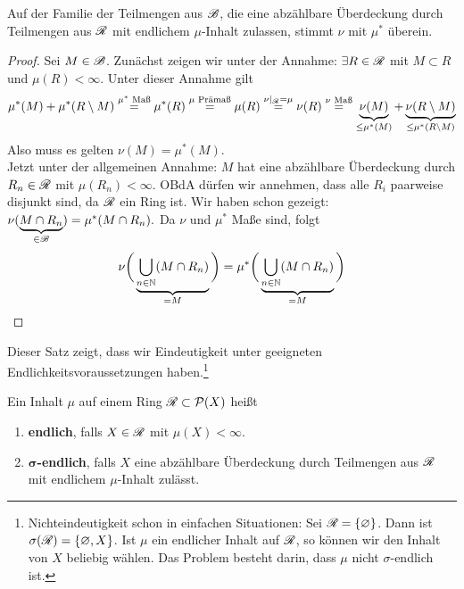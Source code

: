 \begin{satz}
\begin{mdframed}
Auf der Familie der Teilmengen aus $\mathscr{B}$, die eine abzählbare Überdeckung durch Teilmengen aus $\mathscr{R}$ mit endlichem $\mu$-Inhalt zulassen, stimmt $\nu$ mit $\mu^*$ überein.
\end{mdframed}
\begin{proof}
Sei $M \in \mathscr{B}$. Zunächst zeigen wir unter der Annahme: $\exists R \in \mathscr{R}$ mit $M \subset R$ und $\mu(R)< \infty$. Unter dieser Annahme gilt
$$
\mu^*(M)+\mu^*(R\setminus M)\overset{\mu^* \text{ Maß}}=\mu^*(R) \overset{\mu \text{ Prämaß}}= \mu (R) \overset{\nu|_{\mathscr{R}}=\mu} = \nu (R) \overset{\nu \text{ Maß}}= \underbrace{\nu(M)}_{\leq \mu^*(M)}+\underbrace{\nu(R \setminus M)}_{\leq \mu^*(R\setminus M)}
$$
Also muss es gelten $\nu(M)= \mu^*(M)$. \\
Jetzt unter der allgemeinen Annahme: $M$ hat eine abzählbare Überdeckung durch $R_n \in \mathscr{R}$ mit $\mu(R_n)< \infty$. OBdA dürfen wir annehmen, dass alle $R_i$ paarweise disjunkt sind, da $\mathscr{R}$ ein Ring ist. Wir haben schon gezeigt: $\nu(\underbrace{M \cap R_n}_{\in \mathscr{B}}) = \mu^*(M\cap  R_n).$
Da $\nu$ und $\mu^*$ Maße sind, folgt
$$
\nu\bigg( \underbrace{\bigcup_{n \in \mathbb{N}} (M \cap R_n)	}_{=M}	\bigg) = \mu^* \bigg( \underbrace{\bigcup_{n \in \mathbb{N}} (M \cap R_n)}_{=M} \bigg)
$$
\end{proof}
\end{satz}
Dieser Satz zeigt, dass wir Eindeutigkeit unter geeigneten Endlichkeitsvoraussetzungen haben.\footnote{Nichteindeutigkeit schon in einfachen Situationen: Sei $\mathscr{R} = \{\varnothing\}$. Dann ist $\sigma(\mathscr{R})=\{\varnothing, X\} $. Ist $\mu$ ein endlicher Inhalt auf $\mathscr{R}$, so können wir den Inhalt von $X$ beliebig wählen. Das Problem besteht darin, dass $\mu$ nicht $\sigma$-endlich ist.}

\begin{definition}
\begin{mdframed}
Ein Inhalt $\mu$ auf einem Ring $\mathscr{R} \subset \mathcal{P}(X)$ heißt 
\begin{enumerate}[label=(\roman*),topsep=3pt, itemsep=0pt]
	\item \textbf{endlich}, falls $X \in \mathscr{R}$ mit $\mu(X) < \infty$.
	\item \textbf{$\boldsymbol\sigma$-endlich}, falls $X$ eine abzählbare Überdeckung durch Teilmengen aus $\mathscr{R}$ mit endlichem $\mu$-Inhalt zulässt.
\end{enumerate}
\end{mdframed}
\end{definition}

